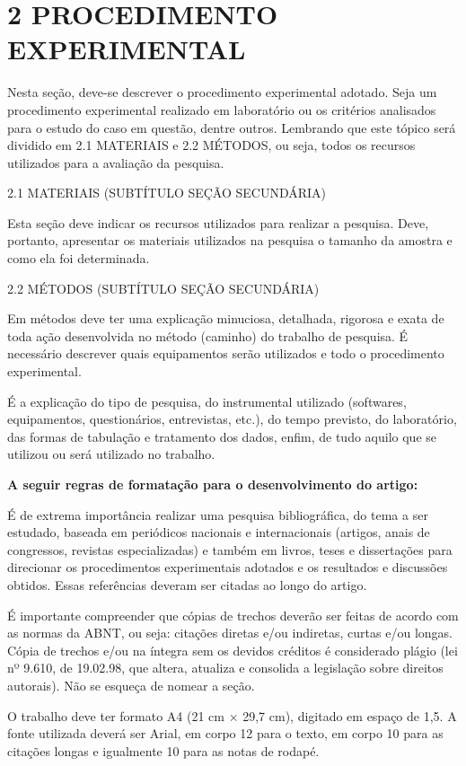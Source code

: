 \documentclass[
]{article}
\begin{document}
\section{2 PROCEDIMENTO EXPERIMENTAL}\label{procedimento-experimental}

Nesta seção, deve-se descrever o procedimento experimental adotado. Seja
um procedimento experimental realizado em laboratório ou os critérios
analisados para o estudo do caso em questão, dentre outros. Lembrando
que este tópico será dividido em 2.1 MATERIAIS e 2.2 MÉTODOS, ou seja,
todos os recursos utilizados para a avaliação da pesquisa.

2.1 MATERIAIS (SUBTÍTULO SEÇÃO SECUNDÁRIA)

Esta seção deve indicar os recursos utilizados para realizar a pesquisa.
Deve, portanto, apresentar os materiais utilizados na pesquisa o tamanho
da amostra e como ela foi determinada.

2.2 MÉTODOS (SUBTÍTULO SEÇÃO SECUNDÁRIA)

Em métodos deve ter uma explicação minuciosa, detalhada, rigorosa e
exata de toda ação desenvolvida no método (caminho) do trabalho de
pesquisa. É necessário descrever quais equipamentos serão utilizados e
todo o procedimento experimental.

É a explicação do tipo de pesquisa, do instrumental utilizado
(softwares, equipamentos, questionários, entrevistas, etc.), do tempo
previsto, do laboratório, das formas de tabulação e tratamento dos
dados, enfim, de tudo aquilo que se utilizou ou será utilizado no
trabalho.

\textbf{A seguir regras de formatação para o desenvolvimento do artigo:}

É de extrema importância realizar uma pesquisa bibliográfica, do tema a
ser estudado, baseada em periódicos nacionais e internacionais (artigos,
anais de congressos, revistas especializadas) e também em livros, teses
e dissertações para direcionar os procedimentos experimentais adotados e
os resultados e discussões obtidos. Essas referências deveram ser
citadas ao longo do artigo.

É importante compreender que cópias de trechos deverão ser feitas de
acordo com as normas da ABNT, ou seja: citações diretas e/ou indiretas,
curtas e/ou longas. Cópia de trechos e/ou na íntegra sem os devidos
créditos é considerado plágio (lei nº 9.610, de 19.02.98, que altera,
atualiza e consolida a legislação sobre direitos autorais). Não se
esqueça de nomear a seção.

O trabalho deve ter formato A4 (21 cm × 29,7 cm), digitado em espaço de
1,5. A fonte utilizada deverá ser Arial, em corpo 12 para o texto, em
corpo 10 para as citações longas e igualmente 10 para as notas de
rodapé.
\end{document}
